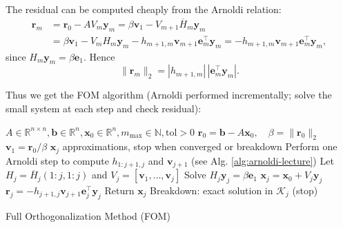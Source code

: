 The residual can be computed cheaply from the Arnoldi relation:
\begin{align*}
    \mathbf{r}_m &= \mathbf{r}_0 - A V_m \mathbf{y}_m
    = \beta \mathbf{v}_1 - V_{m+1}\overline{H}_m \mathbf{y}_m \\
    &= \beta \mathbf{v}_1 - V_m H_m \mathbf{y}_m - h_{m+1,m}\mathbf{v}_{m+1} \mathbf{e}_m^\top \mathbf{y}_m
    = -h_{m+1,m}\mathbf{v}_{m+1} \mathbf{e}_m^\top \mathbf{y}_m,
\end{align*}
since $H_m\mathbf{y}_m=\beta\mathbf{e}_1$. Hence
\[
    \|\mathbf{r}_m\|_2 = |h_{m+1,m}|\,|\mathbf{e}_m^\top \mathbf{y}_m|.
\]

Thus we get the FOM algorithm (Arnoldi performed incrementally; solve the small system at each step and check residual):

\begin{algorithm}[htbp]
    \begin{algorithmic}
        \Require
        \State $A \in \mathbb{R}^{n \times n}, \mathbf{b} \in \mathbb{R}^n, \mathbf{x}_0 \in \mathbb{R}^n, m_{\max} \in \mathbb{N}, \text{tol} > 0$
        \State $\mathbf{r}_0 = \mathbf{b} - A\mathbf{x}_0, \quad \beta = \|\mathbf{r}_0\|_2$
        \State $\mathbf{v}_1 = \mathbf{r}_0 / \beta$
        \Ensure
        \State $\mathbf{x}_j$ approximations, stop when converged or breakdown
        \State Perform one Arnoldi step to compute $h_{1:j+1,j}$ and $\mathbf{v}_{j+1}$ (see Alg. \ref{alg:arnoldi-lecture})
        \State Let $H_j = \overline{H}_j(1:j,1:j)$ and $V_j = [\mathbf{v}_1,\ldots,\mathbf{v}_j]$
        \State Solve $H_j \mathbf{y}_j = \beta \mathbf{e}_1$
        \State $\mathbf{x}_j = \mathbf{x}_0 + V_j \mathbf{y}_j$
        \State $\mathbf{r}_j = -h_{j+1,j} \mathbf{v}_{j+1} \mathbf{e}_j^\top \mathbf{y}_j$
        \State Return $\mathbf{x}_j$
        \EndIf
        \State Breakdown: exact solution in $\mathcal{K}_j$ (stop)
        \EndIf
        \EndFor
    \end{algorithmic}
    \caption{Full Orthogonalization Method (FOM)}
    \label{alg:fom}
\end{algorithm}